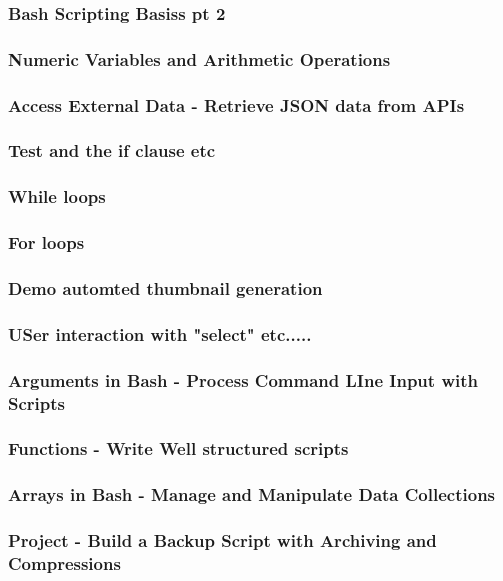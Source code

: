 \documentclass[a4paper, 11pt]{book}
\begin{document}
    \subsubsection{Bash Scripting Basiss pt 2}
    \subsubsection{Numeric Variables and Arithmetic Operations}
    \subsubsection{Access External Data - Retrieve JSON data from APIs}
    \subsubsection{Test and the if clause etc}
    \subsubsection{While loops}
    \subsubsection{For loops}
    \subsubsection{Demo automted thumbnail generation}
    \subsubsection{USer interaction with "select" etc.....}
    \subsubsection{Arguments in Bash - Process Command LIne Input with Scripts}
    \subsubsection{Functions - Write Well structured scripts}
    \subsubsection{Arrays in Bash - Manage and Manipulate Data Collections}
    \subsubsection{Project - Build a Backup Script with Archiving and Compressions}
\end{document}
